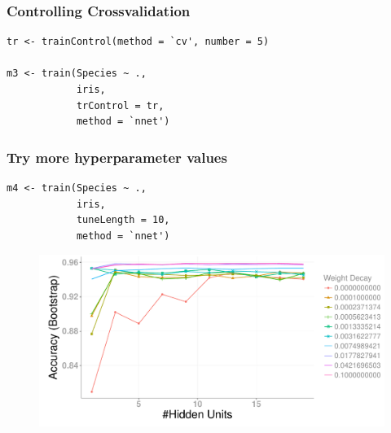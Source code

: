 \documentclass{beamer}
\begin{document}
\begin{frame}[fragile]
\frametitle{Controlling Crossvalidation}
\renewcommand{\FancyVerbFormatLine}[1]{%
   \ifnum\value{FancyVerbLine}=1\color{cyan}#1%
   \else #1\fi}

\begin{Verbatim}
tr <- trainControl(method = `cv', number = 5)

m3 <- train(Species ~ ., 
            iris,
            trControl = tr,
            method = `nnet')
\end{Verbatim}

\end{frame} 



\begin{frame}[fragile]
\frametitle{Try more hyperparameter values}
\renewcommand{\FancyVerbFormatLine}[1]{%
   \ifnum\value{FancyVerbLine}=3\color{cyan}#1%
   \else #1\fi}

\begin{Verbatim}
m4 <- train(Species ~ ., 
            iris,
            tuneLength = 10,
            method = `nnet')
\end{Verbatim}

\begin{figure}
    \includegraphics[height = 0.5\textheight]{train_nnet_tuneLength}
\end{figure} 
\end{frame} 
\end{document}
